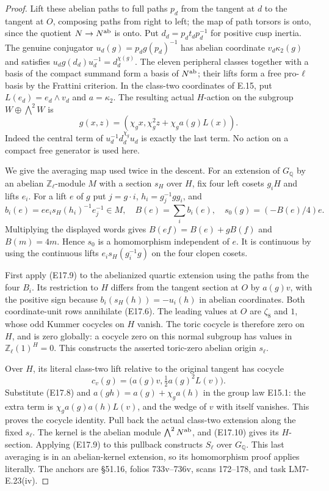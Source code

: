 \begin{proof}
Lift these abelian paths to full paths $p_d$ from
the tangent at $d$ to the tangent at $O$, composing
paths from right to left; the
map of path torsors is onto, since the quotient
$N\to N^{\rm ab}$ is onto. Put
$d_d=p_dt_dp_d^{-1}$ for positive cusp inertia.
The genuine conjugator $u_d(g)=p_dg(p_d)^{-1}$ has
abelian coordinate $v_d\kappa_2(g)$ and satisfies
$u_dg(d_d)u_d^{-1}=d_d^{\chi(g)}$.
The eleven peripheral classes together with a basis
of the compact summand form a basis of $N^{\rm ab}$;
their lifts form a free pro-$\ell$ basis by the
Frattini criterion. In the class-two coordinates of
E.15, put $L(e_d)=e_d\wedge v_d$ and $a=\kappa_2$.
The resulting actual $H$-action on the subgroup
$W\oplus\bigwedge^2W$ is
\[
 g(x,z)=(\chi_gx,\chi_g^2z+\chi_ga(g)L(x)).
 \tag{E17.8}
\]
Indeed the central term of
$u_d^{-1}d_d^{\chi_g}u_d$ is exactly the last term.
No action on a compact free generator is used here.

We give the averaging map used twice in the descent.
For an extension of $G_{\mathbb Q}$ by an abelian
$\mathbb Z_\ell$-module $M$ with a section $s_H$
over $H$, fix four left cosets $g_iH$ and lifts $e_i$.
For a lift $e$ of $g$ put $j=g\cdot i$,
$h_i=g_j^{-1}gg_i$, and
\[
 b_i(e)=e e_i s_H(h_i)^{-1}e_j^{-1}\in M,
 \quad B(e)=\sum_i b_i(e),
 \quad s_0(g)=(-B(e)/4)e .
 \tag{E17.9}
\]
Multiplying the displayed words gives
$B(ef)=B(e)+gB(f)$ and $B(m)=4m$.
Hence $s_0$ is a homomorphism independent of $e$.
It is continuous by using the continuous lifts
$e_i s_H(g_i^{-1}g)$ on the four clopen cosets.

First apply (E17.9) to the abelianized quartic
extension using the paths from the four $B_i$.
Its restriction to $H$ differs from the tangent
section at $O$ by $a(g)v$, with the positive sign
because $b_i(s_H(h))=-u_i(h)$ in abelian coordinates.
Both coordinate-unit rows annihilate (E17.6).
The leading values at $O$ are $\zeta_8$ and $1$,
whose odd Kummer cocycles on $H$ vanish. The toric
cocycle is therefore zero on $H$, and is zero
globally: a cocycle zero on this normal subgroup
has values in $\mathbb Z_\ell(1)^{H}=0$.
This constructs the asserted toric-zero abelian
origin $s_\ell$.

Over $H$, its literal class-two lift relative to
the original tangent has cocycle
\[
 c_v(g)=\bigl(a(g)v,\tfrac12a(g)^2L(v)\bigr).
 \tag{E17.10}
\]
Substitute (E17.8) and
$a(gh)=a(g)+\chi_ga(h)$ in the group law E15.1:
the extra term is
$\chi_ga(g)a(h)L(v)$, and the wedge of $v$ with
itself vanishes. This proves the cocycle identity.
Pull back the actual class-two extension along the
fixed $s_\ell$. The kernel is the abelian module
$\bigwedge^2N^{\rm ab}$, and (E17.10) gives its
$H$-section. Applying (E17.9) to this pullback
constructs $S_\ell$ over $G_{\mathbb Q}$.
This last averaging is in an abelian-kernel
extension, so its homomorphism proof applies
literally. The anchors are \S51.16, folios
733v--736v, scans 172--178, and task LM7-E.23(iv).
\end{proof}

